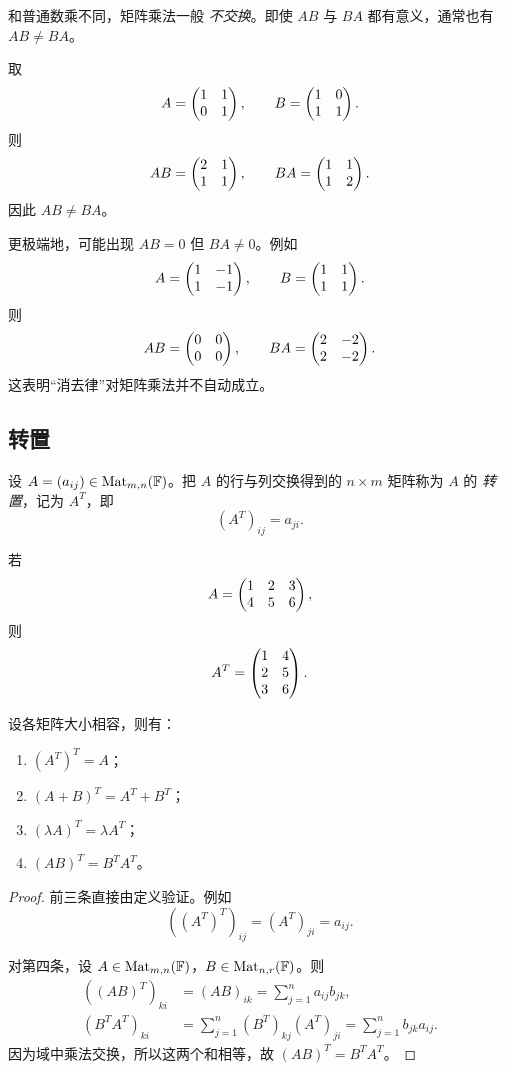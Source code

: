 \begin{remark}
和普通数乘不同，矩阵乘法一般 \emph{不交换}。即使 $AB$ 与 $BA$ 都有意义，通常也有 $AB\ne BA$。
\end{remark}

\begin{example}[矩阵乘法不交换]
取
\[
A=\begin{pmatrix} 1&1\\0&1 \end{pmatrix},\qquad B=\begin{pmatrix} 1&0\\1&1 \end{pmatrix}.
\]
则
\[
AB=\begin{pmatrix} 2&1\\1&1 \end{pmatrix},\qquad BA=\begin{pmatrix} 1&1\\1&2 \end{pmatrix}.
\]
因此 $AB\ne BA$。

更极端地，可能出现 $AB=0$ 但 $BA\ne 0$。例如
\[
A=\begin{pmatrix} 1&-1\\1&-1 \end{pmatrix},\qquad B=\begin{pmatrix} 1&1\\1&1 \end{pmatrix}.
\]
则
\[
AB=\begin{pmatrix} 0&0\\0&0 \end{pmatrix},\qquad BA=\begin{pmatrix} 2&-2\\2&-2 \end{pmatrix}.
\]
这表明“消去律”对矩阵乘法并不自动成立。
\end{example}

\subsection{转置}

\begin{definition}
设 $A=(a_{ij})\in\mathrm{Mat}_{m,n}(\mathbb{F})$。把 $A$ 的行与列交换得到的 $n\times m$ 矩阵称为 $A$ 的 \emph{转置}，记为 $A^T$，即
\[
(A^T)_{ij}=a_{ji}.
\]
\end{definition}

\begin{example}
若
\[
A=\begin{pmatrix} 1&2&3\\4&5&6 \end{pmatrix},
\]
则
\[
A^T=\begin{pmatrix} 1&4\\2&5\\3&6 \end{pmatrix}.
\]
\end{example}

\begin{proposition}[转置的性质]
设各矩阵大小相容，则有：
\begin{enumerate}[label=(\arabic*)]
  \item $(A^T)^T=A$；
  \item $(A+B)^T=A^T+B^T$；
  \item $(\lambda A)^T=\lambda A^T$；
  \item $(AB)^T=B^TA^T$。
\end{enumerate}
\end{proposition}

\begin{proof}
前三条直接由定义验证。例如
\[
((A^T)^T)_{ij}=(A^T)_{ji}=a_{ij}.
\]

对第四条，设 $A\in\mathrm{Mat}_{m,n}(\mathbb{F})$，$B\in\mathrm{Mat}_{n,r}(\mathbb{F})$。则
\begin{align*}
((AB)^T)_{ki}&=(AB)_{ik}=\sum_{j=1}^n a_{ij}b_{jk},\\
(B^TA^T)_{ki}&=\sum_{j=1}^n (B^T)_{kj}(A^T)_{ji}=\sum_{j=1}^n b_{jk}a_{ij}.
\end{align*}
因为域中乘法交换，所以这两个和相等，故 $(AB)^T=B^TA^T$。
\end{proof}

